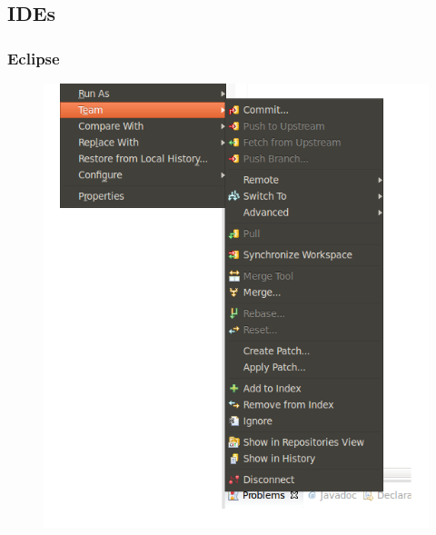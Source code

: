\documentclass{beamer}
\begin{document}
\subsection{IDEs}

\begin{frame}
    \frametitle{Eclipse}
    \begin{figure}[h!]
        \begin{center}
            \includegraphics[scale=0.55]{eclipse1.png}
        \end{center}
    \end{figure}
\end{frame}
\end{document}
